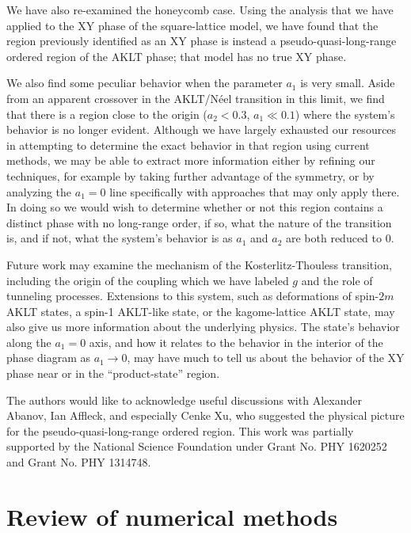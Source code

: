 \documentclass[aps,prb,letterpaper,superscriptaddress,twocolumn,showpacs,floatfix,10pt]{revtex4-1}
\begin{document}
We have also re-examined the honeycomb case. Using the analysis that we have
applied to the XY phase of the square-lattice model, we have
found that the region previously identified
as an XY phase is instead a pseudo-quasi-long-range ordered region of the
AKLT phase; that model has no true XY phase.

We also find some peculiar behavior when the parameter $a_1$ is very small.
Aside from an apparent crossover in the AKLT/N\'eel transition in this limit,
we find that there is a region close to the origin ($a_2<0.3$, $a_1\ll 0.1$)
where the system's behavior is no longer evident. Although we have largely
exhausted our resources in attempting to determine the exact behavior in that
region using current methods, we may be able to extract more information
either by refining our techniques, for example by taking further advantage of
the symmetry\cite{Singh1}, or by analyzing the $a_1=0$ line specifically
with approaches that may only apply there. In doing so we would wish to
determine whether or not this region contains a distinct
phase with no long-range order, if so, what the nature of the transition is,
and if not, what the system's behavior is as $a_1$ and $a_2$ are both reduced
to 0.

Future work may examine the mechanism of the Kosterlitz-Thouless transition,
including the origin of the coupling which we have labeled $g$ and the role of
tunneling processes. Extensions to this system, such as deformations of 
spin-$2m$ AKLT states, a spin-1 AKLT-like state, or the kagome-lattice AKLT
state, may also give us more information about the underlying physics.
The state's behavior along the $a_1=0$ axis, and how it relates to the
behavior in the interior of the phase diagram as $a_1\to 0$,
may have much to tell us about the behavior of the XY phase near or in the
``product-state'' region.

\nocite{Kosterlitz}

\acknowledgments
The authors would like to acknowledge useful discussions with
Alexander Abanov, Ian Affleck, and
especially Cenke Xu, who suggested the physical picture for the
pseudo-quasi-long-range ordered region.
This work was partially supported by
the National Science Foundation under Grant No. PHY 1620252 and Grant
No. PHY 1314748.

\appendix
\FloatBarrier
\section {Review of  numerical methods }
\label{app:methods}
\end{document}
